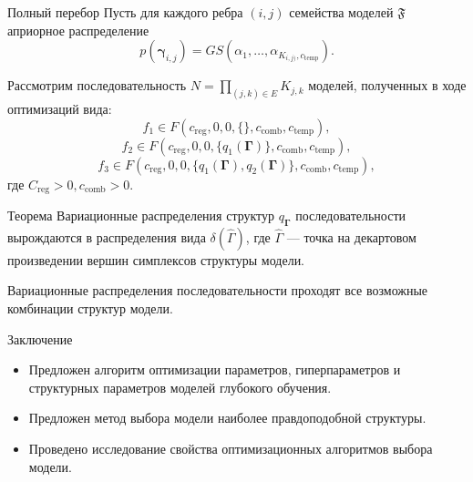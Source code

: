 \documentclass[usenames,dvipsnames,11pt,pdf,utf8,russian,aspectratio=169]{beamer}
\begin{document}
\begin{frame}{Полный перебор}
\small
Пусть для каждого ребра $(i,j)$ семейства моделей $\mathfrak{F}$ априорное распределение $$p(\boldsymbol{\gamma}_{i,j}) =  GS (\alpha_1, \dots, \alpha_{K_{i,j)}, c_{\text{temp}}}).$$

Рассмотрим последовательность $N = \prod_{(j,k) \in E} K_{j,k}$ моделей, полученных в ходе оптимизаций вида:
$$f_1 \in F(c_{\text{reg}}, 0, 0, \{\}, c_{\text{comb}},  c_{\text{temp}}),$$
$$f_2 \in F(c_{\text{reg}}, 0, 0, \{q_1(\boldsymbol{\Gamma})\},  c_{\text{comb}},  c_{\text{temp}}),$$
$$f_3 \in F(c_{\text{reg}}, 0, 0, \{q_1(\boldsymbol{\Gamma}), q_2(\boldsymbol{\Gamma})\},  c_{\text{comb}},  c_{\text{temp}}),$$
где $C_{\text{reg}} > 0,  c_{\text{comb}}>0$.


\begin{block}{Теорема}
Вариационные распределения структур $q_{\boldsymbol{\Gamma}}$ последовательности вырождаются в распределения вида $\delta(\hat{\Gamma})$, где $\hat{\Gamma}$ --- точка на декартовом произведении вершин симплексов структуры модели.

Вариационные распределения последовательности проходят все возможные комбинации структур модели.
\end{block}
\end{frame}


\begin{frame}{Заключение}
\begin{itemize}
\item Предложен алгоритм оптимизации параметров, гиперпараметров и структурных
параметров моделей глубокого обучения.
\item Предложен метод выбора модели наиболее правдоподобной структуры.
\item Проведено исследование свойства оптимизационных алгоритмов выбора модели.
\end{itemize}
\end{frame}
\end{document}
